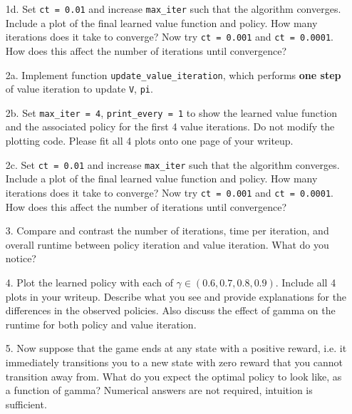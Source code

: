 \documentclass[submit]{../harvardml}
\begin{document}
\begin{framed}
\begin{itemize}
    \item [1d.] Set \texttt{ct = 0.01} and increase \texttt{max\_iter} such that the algorithm converges. Include a plot of the final learned value function and policy. How many iterations does it take to converge? Now try \texttt{ct = 0.001} and \texttt{ct = 0.0001}. How does this affect the number of iterations until convergence?
      
    \item [2a.] Implement function
      \texttt{update\_value\_iteration}, which performs \textbf{one step} of value iteration to update \texttt{V}, \texttt{pi}.
      
    \item [2b.] Set \texttt{max\_iter = 4}, \texttt{print\_every = 1} to show the learned value function and the associated policy for the first 4 value iterations. Do not modify the plotting code. Please fit all 4 plots onto one page of your writeup.
    
    \item [2c.] Set \texttt{ct = 0.01} and increase \texttt{max\_iter} such that the algorithm converges. Include a plot of the final learned value function and policy. How many iterations does it take to converge? Now try \texttt{ct = 0.001} and \texttt{ct = 0.0001}. How does this affect the number of iterations until convergence?
    
    \item[3.] Compare and contrast the number of iterations, time per iteration, and overall runtime between policy iteration and value iteration. What do you notice?
    
    \item[4.] Plot the learned policy with each of $\gamma \in (0.6,0.7,0.8,0.9)$. Include all 4 plots in your writeup. Describe what you see and provide explanations for the differences in the observed policies. Also discuss the effect of gamma on the runtime for both policy and value iteration.
    
    \item[5.] Now suppose that the game ends at any state with a positive reward, i.e. it immediately transitions you to a new state with zero reward that you cannot transition away from. What do you expect the optimal policy to look like, as a function of gamma? Numerical answers are not required, intuition is sufficient.
 
\end{itemize}
\end{framed}
\end{document}
